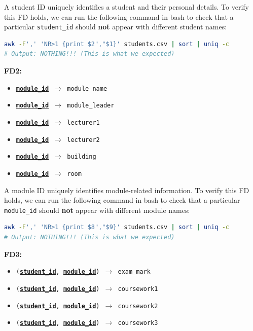 \documentclass[12pt, a4paper]{report}
\begin{document}
A student ID uniquely identifies a student and their personal details. To verify this FD holds, we can run the following command in bash to check that a particular \texttt{student\_id} should \textbf{not} appear with different student names:

\begin{lstlisting}[language=bash]
awk -F',' 'NR>1 {print $2","$1}' students.csv | sort | uniq -c
# Output: NOTHING!!! (This is what we expected)
\end{lstlisting}

\medskip
\noindent \textbf{FD2:}

\begin{itemize}
    \item{\texttt{\textbf{\underline{module\_id}} $\rightarrow$ module\_name}}
    \item{\texttt{\textbf{\underline{module\_id}} $\rightarrow$ module\_leader}}
    \item{\texttt{\textbf{\underline{module\_id}} $\rightarrow$ lecturer1}}
    \item{\texttt{\textbf{\underline{module\_id}} $\rightarrow$ lecturer2}}
    \item{\texttt{\textbf{\underline{module\_id}} $\rightarrow$ building}}
    \item{\texttt{\textbf{\underline{module\_id}} $\rightarrow$ room}}
\end{itemize}

A module ID uniquely identifies module-related information. To verify this FD holds, we can run the following command in bash to check that a particular \texttt{module\_id} should \textbf{not} appear with different module names:

\begin{lstlisting}[language=bash]
awk -F',' 'NR>1 {print $8","$9}' students.csv | sort | uniq -c
# Output: NOTHING!!! (This is what we expected)
\end{lstlisting}

\medskip
\noindent \textbf{FD3:}

\begin{itemize}
    \item{\texttt{(\textbf{\underline{student\_id}}, \textbf{\underline{module\_id}}) $\rightarrow$ exam\_mark}}
    \item{\texttt{(\textbf{\underline{student\_id}}, \textbf{\underline{module\_id}}) $\rightarrow$ coursework1}}
    \item{\texttt{(\textbf{\underline{student\_id}}, \textbf{\underline{module\_id}}) $\rightarrow$ coursework2}}
    \item{\texttt{(\textbf{\underline{student\_id}}, \textbf{\underline{module\_id}}) $\rightarrow$ coursework3}}
\end{itemize}
\end{document}
